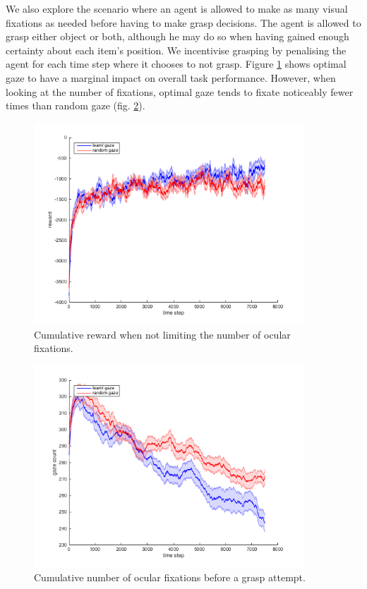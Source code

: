 \documentclass[11]{article}
\begin{document}
We also explore the scenario where an agent is allowed to make as many visual fixations as needed before having to make grasp decisions. 
The agent is allowed to grasp either object or both, although he may do so when having gained enough certainty about each item's position. 
We incentivise grasping by penalising the agent for each time step where it chooses to not grasp.
Figure \ref{fig:resultsTimless} shows optimal gaze to have a marginal impact on overall task performance.
However, when looking at the number of fixations, optimal gaze tends to fixate noticeably fewer times than random gaze (fig. \ref{fig:gazeCount}). 

\begin{figure}[!h]
	\centering
	\includegraphics[width=0.9\textwidth]{figures/resultsTimeless.png}
	\caption{Cumulative reward when not limiting the number of ocular fixations.}
	\label{fig:resultsTimless}
\end{figure}


\begin{figure}[!h]
	\centering
	\includegraphics[width=0.9\textwidth]{figures/gazeCount.png}
	\caption{Cumulative number of ocular fixations before a grasp attempt.}
	\label{fig:gazeCount}
\end{figure}

\pagebreak
\printbibliography
\end{document}
